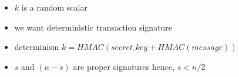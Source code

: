 \begin{itemize}
    \item $k$ is a random scalar
    \item we want deterministic transaction signature
    \item determinism $k = HMAC(secret\_key + HMAC(message))$
    \item $s$ and $(n-s)$ are proper signatures hence, $s < n/2$
\end{itemize}

